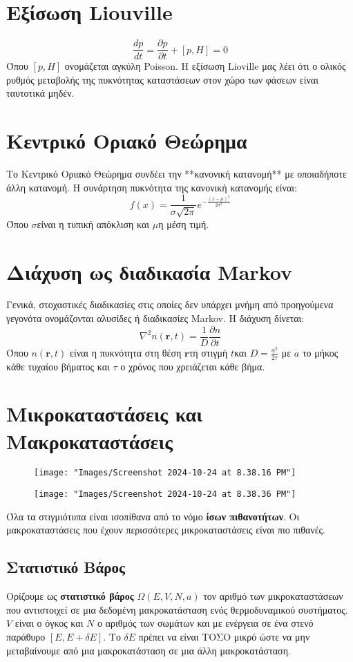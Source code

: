 \documentclass[11pt, oneside]{article}   	%
\begin{document}
\section{Εξίσωση Liouville}
\[\frac{dp}{dt} = \frac{\partial p}{\partial t} + [p,H] = 0\]
Όπου $[p,H]$ ονομάζεται αγκύλη Poisson.
Η εξίσωση Lioville μας λέει ότι ο ολικός ρυθμός μεταβολής της πυκνότητας καταστάσεων στον χώρο των φάσεων είναι ταυτοτικά μηδέν.

\section{Κεντρικό Οριακό Θεώρημα}
Το Κεντρικό Οριακό Θεώρημα συνδέει την **κανονική κατανομή** με οποιαδήποτε άλλη κατανομή.
Η συνάρτηση πυκνότητα της κανονική κατανομής είναι:
\[f(x)=\frac{1}{\sigma \sqrt{2\pi}}e^{-\frac{(x-\mu)^2}{2\sigma^2}}\]
Όπου $\sigma$είναι η τυπική απόκλιση και $\mu$η μέση τιμή.

\section{Διάχυση ως διαδικασία Markov}
Γενικά, στοχαστικές διαδικασίες στις οποίες δεν υπάρχει μνήμη από προηγούμενα γεγονότα ονομάζονται αλυσίδες ή διαδικασίες Markov.
Η διάχυση δίνεται:
\[\nabla^2 n(\mathbf{r},t) = \frac 1 D \frac{\partial n}{\partial t}\]
Όπου $n(\mathbf{r},t)$ είναι η πυκνότητα στη θέση $\mathbf{r}$τη στιγμή $t$και $D=\frac{a^2}{2\tau}$ με $a$ το μήκος κάθε τυχαίου βήματος και $\tau$ ο χρόνος που χρειάζεται κάθε βήμα.

\section{Μικροκαταστάσεις και Μακροκαταστάσεις}

\begin{figure}[H]
	\centering
	\texttt{[image: "Images/Screenshot 2024-10-24 at 8.38.16 PM"]}
	\caption{}
	\label{fig:screenshot-2024-10-24-at-8}
\end{figure}
\begin{figure}[H]
	\centering
	\texttt{[image: "Images/Screenshot 2024-10-24 at 8.38.36 PM"]}
	\caption{}
	\label{fig:screenshot-2024-10-24-at-8}
\end{figure}
Όλα τα στιγμιότυπα είναι ισοπίθανα από το νόμο \textbf{ίσων πιθανοτήτων}. Οι μακροκαταστάσεις που έχουν περισσότερες μικροκαταστάσεις είναι πιο πιθανές.

\subsection{Στατιστικό Βάρος}
Ορίζουμε ως \textbf{στατιστικό βάρος} $\Omega(E,V,N,a)$ τον αριθμό των μικροκαταστάσεων που αντιστοιχεί σε μια δεδομένη μακροκατάσταση ενός θερμοδυναμικού συστήματος.
$V$ είναι ο όγκος και $N$ ο αριθμός των σωμάτων και με ενέργεια σε ένα στενό παράθυρο $[E,E +\delta E]$. Το $\delta E$ πρέπει να είναι ΤΟΣΟ μικρό ώστε να μην μεταβαίνουμε από μια μακροκατάσταση σε μια άλλη μακροκατάσταση.
\end{document}
